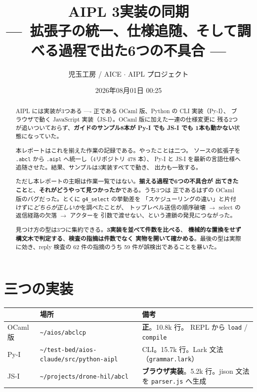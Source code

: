 \documentclass[11pt,a4paper]{ltjsarticle}
\title{AIPL 3実装の同期\\
{\large ---\ 拡張子の統一、仕様追随、そして調べる過程で出た6つの不具合 ---}}
\author{児玉工房 / AICE $\cdot$ AIPL プロジェクト}
\date{2026年08月01日 00:25}
\begin{document}
\maketitle

\begin{abstract}
AIPL には実装が3つある ---- 正である OCaml 版、Python の CLI 実装（Py-I）、
ブラウザで動く JavaScript 実装（JS-I）。OCaml 版に加えた一連の仕様変更に
残る2つが追いついておらず、\textbf{ガイドのサンプル8本が Py-I でも JS-I でも
1本も動かない}状態になっていた。

本レポートはこれを揃えた作業の記録である。やったことは二つ。
ソースの拡張子を \texttt{.abcl} から \texttt{.aipl} へ統一し（4リポジトリ 478 本）、
Py-I と JS-I を最新の言語仕様へ追随させた。結果、サンプルは3実装すべてで動き、
出力も一致する。

ただし本レポートの主眼は作業一覧ではない。\textbf{揃える過程で6つの不具合が
出てきたこと}と、\textbf{それがどうやって見つかったか}である。うち3つは
正であるはずの OCaml 版のバグだった。とくに \texttt{g4\_select} の挙動差を
「スケジューリングの違い」と片付けずに\emph{どちらが正しいか}を調べたことが、
トップレベル送信の順序破壊 $\to$ select の返信経路の欠落 $\to$ アクターを
引数で渡せない、という連鎖の発見につながった。

見つけ方の型は3つに集約できる。\textbf{3実装を並べて件数を比べる}、
\textbf{機械的な置換をせず構文木で判定する}、\textbf{検査の指摘は件数でなく
実物を開いて確かめる}。最後の型は実際に効き、reply 検査の 62 件の指摘のうち
59 件が誤検出であることを暴いた。
\end{abstract}

\tableofcontents

\section{三つの実装}

\begin{center}
\small
\begin{tabular}{@{}llp{6.2cm}@{}}
\toprule
 & 場所 & 備考 \\
\midrule
OCaml 版 & \texttt{\textasciitilde/aios/abclcp} & \textbf{正}。10.8k 行。
  REPL から \texttt{load} / \texttt{compile} \\
Py-I & \texttt{\textasciitilde/test-bed/aios-claude/src/python-aipl} &
  CLI。15.7k 行。Lark 文法（\texttt{grammar.lark}）\\
JS-I & \texttt{\textasciitilde/projects/drone-hil/abcl} &
  \textbf{ブラウザ実装}。5.2k 行。jison 文法を
  \texttt{parser.js} へ生成 \\
\bottomrule
\end{tabular}
\end{center}
\end{document}
